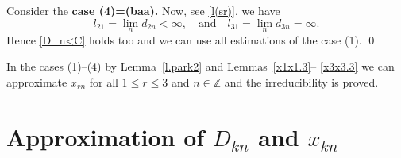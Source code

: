 \documentclass[preprint,12pt]{elsarticle}
\numberwithin{equation}{section}
\begin{document}
\begin{pf}
Consider the {\bf case (4)=(baa).
}
Now, see \eqref{l(sr)}, we have 
\begin{equation*}
 l_{21}\!=\!\lim_nd_{2n}<\infty,\quad\text{and}  \quad
l_{31}\!=\!\lim_nd_{3n}=\infty. 
\end{equation*}
Hence \eqref{D_n<C}  holds too and we can use
all estimations of the case (1).
%
\qed\end{pf}
\begin{rem}
\label{r.(1)}
In the cases (1)--(4) by Lemma~\ref{l.park2} and Lemmas~\ref{x1x1.3}--  \ref{x3x3.3} we can approximate $x_{rn}$ for all $1\leq r\leq 3$ and $n\in \mathbb Z$ and the irreducibility is proved.
\end{rem}









\section{Approximation of $D_{kn}$ and $x_{kn}$}
\end{document}
